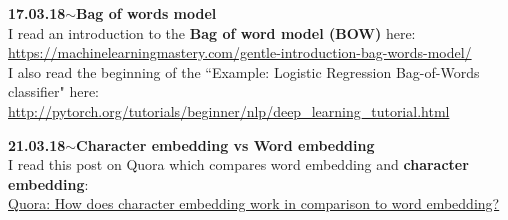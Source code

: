 \documentclass[11pt,a4paper]{article}
\newenvironment{loggentry}[2]%
{\noindent\textbf{#1}\hspace{1cm}$\mathbf{\sim}$\text{ }\textbf{#2}\\}{\vspace{0.5cm}}
\begin{document}
\begin{loggentry}{17.03.18}{Bag of words model}
I read an introduction to the \textbf{Bag of word model (BOW)} here:\\
\url{https://machinelearningmastery.com/gentle-introduction-bag-words-model/}\\
I also read the beginning of the ``Example: Logistic Regression Bag-of-Words classifier" here:\\
\url{http://pytorch.org/tutorials/beginner/nlp/deep_learning_tutorial.html}
\end{loggentry}

\begin{loggentry}{21.03.18}{Character embedding vs Word embedding}
I read this post on Quora which compares word embedding and \textbf{character embedding}:\\
\href{https://www.quora.com/How-does-character-embedding-work-in-comparison-to-word-embedding}{Quora: How does character embedding work in comparison to word embedding?}\\
\end{loggentry}
\end{document}
